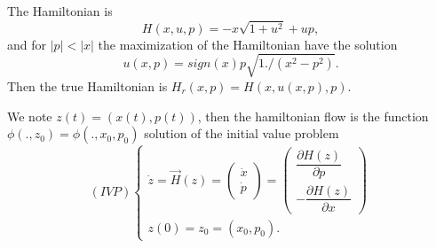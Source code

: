 \documentclass[11pt]{article}
\begin{document}
The Hamiltonian is \[H(x,u,p) =  -x\sqrt{1+u^2} + up,\] and for
\(|p| < |x|\) the maximization of the Hamiltonian have the solution
\[u(x,p) = sign(x)p\sqrt{1. /(x^2-p^2)}.\] Then the true Hamiltonian is
\(H_r(x,p)=H(x,u(x,p),p)\).

We note \(z(t) = (x(t),p(t))\), then the hamiltonian flow is the
function \(\phi(.,z_0) = \phi(.,x_0,p_0)\) solution of the initial value
problem \[(IVP)\left\{
\begin{array}{l}
\dot{z} = \vec{H}(z) = \begin{pmatrix}
\dot{x}\\ \dot{p}
\end{pmatrix} =
\begin{pmatrix}
\dfrac{\partial H(z)}{\partial p}\\
-\dfrac{\partial H(z)}{\partial x}
\end{pmatrix}\\
z(0) = z_0 = (x_0,p_0).
\end{array}
    \right.\]
\end{document}
